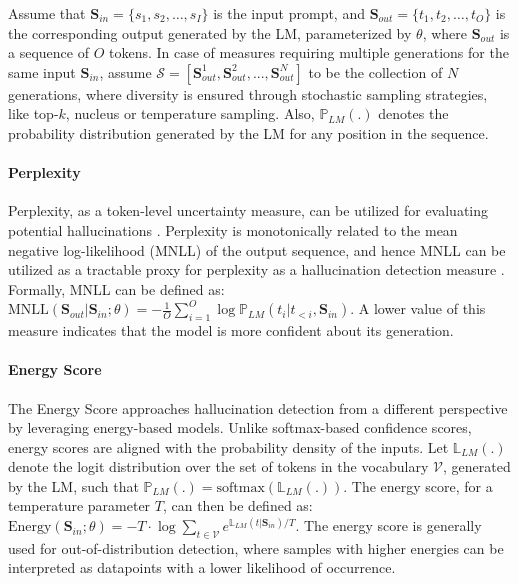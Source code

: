Assume that $\mathbf{S}_{in} = \{s_1, s_2, \ldots, s_I\}$ is the input prompt, and $\mathbf{S}_{out} = \{t_1, t_2, \ldots, t_O\}$ is the corresponding output generated by the LM, parameterized by $\theta$, where $\mathbf{S}_{out}$ is a sequence of $O$ tokens. In case of measures requiring multiple generations for the same input $\mathbf{S}_{in} $, assume $\mathcal{S} =[\mathbf{S}_{out}^1, \mathbf{S}_{out}^2, ..., \mathbf{S}_{out}^N]$ to be the collection of $N$ generations, where diversity is ensured through stochastic sampling strategies, like top-$k$, nucleus or temperature sampling. Also, $\mathbb{P}_{LM}(.)$ denotes the probability distribution generated by the LM for any position in the sequence. 
\paragraph{\textbf{Perplexity}}
 Perplexity, as a token-level uncertainty measure, can be utilized for evaluating potential hallucinations \citep{ren_out--distribution_2023}. Perplexity is monotonically related to the mean negative log-likelihood (MNLL) of the output sequence, and hence MNLL can be utilized as a tractable proxy for perplexity as a hallucination detection measure \citep{chen_inside:_2024}. Formally, MNLL can be defined as: $\text{MNLL}(\mathbf{S}_{out}|\mathbf{S}_{in}; \theta) = -\frac{1}{O}\sum_{i=1} ^{O}\log \mathbb{P}_{LM}(t_i|t_{<i}, \mathbf{S}_{in})$. A lower value of this measure indicates that the model is more confident about its generation. %

\paragraph{\textbf{Energy Score}}
The Energy Score \citep{liu_energy-based_2020} approaches hallucination detection from a different perspective by leveraging energy-based models. Unlike softmax-based confidence scores, energy scores are aligned with the probability density of the inputs. 
Let $\mathbb{L}_{LM}(.)$ denote the logit distribution over the set of tokens in the vocabulary $\mathcal{V}$, generated by the LM, such that $\mathbb{P}_{LM}(.) = \text{softmax}(\mathbb{L}_{LM}(.))$. The energy score, for a temperature parameter $T$, can then be defined as: $\text{Energy}(\mathbf{S}_{in}; \theta) = -T \cdot \log\sum_{t \in \mathcal{V}} e^{\mathbb{L}_{LM}(t|\mathbf{S}_{in})/T}$. The energy score is generally used for out-of-distribution detection, where samples with higher energies can be interpreted as datapoints with a lower likelihood of occurrence.

